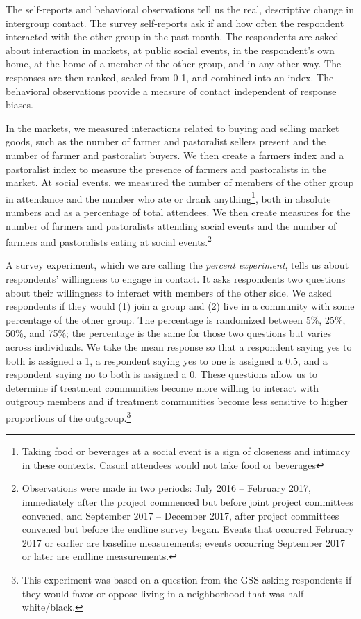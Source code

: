 \documentclass[11pt]{article}
\begin{document}
The self-reports and behavioral observations tell us the real,
descriptive change in intergroup contact. The survey self-reports ask if
and how often the respondent interacted with the other group in the past
month. The respondents are asked about interaction in markets, at public
social events, in the respondent's own home, at the home of a member of
the other group, and in any other way. The responses are then ranked,
scaled from 0-1, and combined into an index. The behavioral observations
provide a measure of contact independent of response biases.

In the markets, we measured interactions related to buying and selling
market goods, such as the number of farmer and pastoralist sellers
present and the number of farmer and pastoralist buyers. We then create
a farmers index and a pastoralist index to measure the presence of
farmers and pastoralists in the market. At social events, we measured
the number of members of the other group in attendance and the number
who ate or drank anything\footnote{Taking food or beverages at a social
  event is a sign of closeness and intimacy in these contexts. Casual
  attendees would not take food or beverages}, both in absolute numbers
and as a percentage of total attendees. We then create measures for the
number of farmers and pastoralists attending social events and the
number of farmers and pastoralists eating at social events.\footnote{Observations
  were made in two periods: July 2016 -- February 2017, immediately
  after the project commenced but before joint project committees
  convened, and September 2017 -- December 2017, after project
  committees convened but before the endline survey began. Events that
  occurred February 2017 or earlier are baseline measurements; events
  occurring September 2017 or later are endline measurements.}

A survey experiment, which we are calling the \emph{percent experiment},
tells us about respondents' willingness to engage in contact. It asks
respondents two questions about their willingness to interact with
members of the other side. We asked respondents if they would (1) join a
group and (2) live in a community with some percentage of the other
group. The percentage is randomized between 5\%, 25\%, 50\%, and 75\%;
the percentage is the same for those two questions but varies across
individuals. We take the mean response so that a respondent saying yes
to both is assigned a 1, a respondent saying yes to one is assigned a
0.5, and a respondent saying no to both is assigned a 0. These questions
allow us to determine if treatment communities become more willing to
interact with outgroup members and if treatment communities become less
sensitive to higher proportions of the outgroup.\footnote{This
  experiment was based on a question from the GSS asking respondents if
  they would favor or oppose living in a neighborhood that was half
  white/black.}
\end{document}
